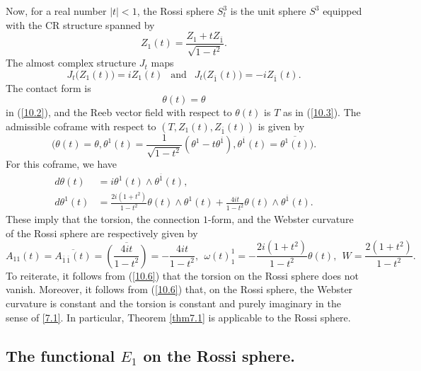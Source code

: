 \documentclass{amsart}
\theoremstyle{Corollary}
\numberwithin{equation}{section}
\begin{document}
Now, for a real number $|t|<1$, the Rossi sphere $S_t^3$ is
the unit sphere $S^3$ equipped with the CR structure spanned by
$$Z_1(t)=\frac{Z_1+tZ_{\overline{1}}}{\sqrt{1-t^2}}.$$
The almost complex structure $J_t$ maps
\begin{equation}\label{10.4}
J_t\big(Z_1(t)\big)=iZ_1(t)~~\mbox{ and }~~J_t\big(Z_{\overline{1}}(t)\big)=-iZ_{\overline{1}}(t).
\end{equation}
The contact form is
$$\theta(t)=\theta$$
in (\ref{10.2}), 
and the Reeb vector field with respect to $\theta(t)$ is $T$ as in (\ref{10.3}). 
The admissible coframe with respect to $(T,Z_1(t),Z_{\overline{1}}(t))$ is given by
$$\Big(\theta(t)=\theta,\theta^1(t)=\frac{1}{\sqrt{1-t^2}}(\theta^1-t\theta^{\overline{1}}),\theta^{\overline{1}}(t)=\overline{\theta^1(t)}\Big).$$
For this coframe, we have
\begin{equation}\label{10.5}
\begin{split}
d\theta(t)&=i\theta^1(t)\wedge\theta^{\overline{1}}(t),\\
d\theta^1(t)&=\frac{2i(1+t^2)}{1-t^2}\theta(t)\wedge \theta^1(t)+\frac{4it}{1-t^2}\theta(t)\wedge \theta^{\overline{1}}(t).
\end{split}
\end{equation}
These imply that  the torsion, the connection $1$-form, and the Webster curvature 
of the Rossi sphere are respectively given by 
\begin{equation}\label{10.6}
A_{11}(t)=\overline{A_{\overline{1}\,\overline{1}}(t)}=\overline{\left(\frac{4it}{1-t^2}\right)}=-\frac{4it}{1-t^2},~~\omega(t)_1^1=-\frac{2i(1+t^2)}{1-t^2}\theta(t),~~W=\frac{2(1+t^2)}{1-t^2}.
\end{equation}
To reiterate, it follows from (\ref{10.6}) that the torsion on the Rossi sphere does not vanish. 
Moreover, it follows from 
(\ref{10.6}) that, on the Rossi sphere, the Webster curvature 
is constant and the torsion is constant and purely imaginary in the sense of \eqref{7.1}. 
In particular, Theorem \ref{thm7.1} is applicable to the Rossi sphere. 



\subsection{The functional $E_1$ on the Rossi sphere.}
\end{document}
